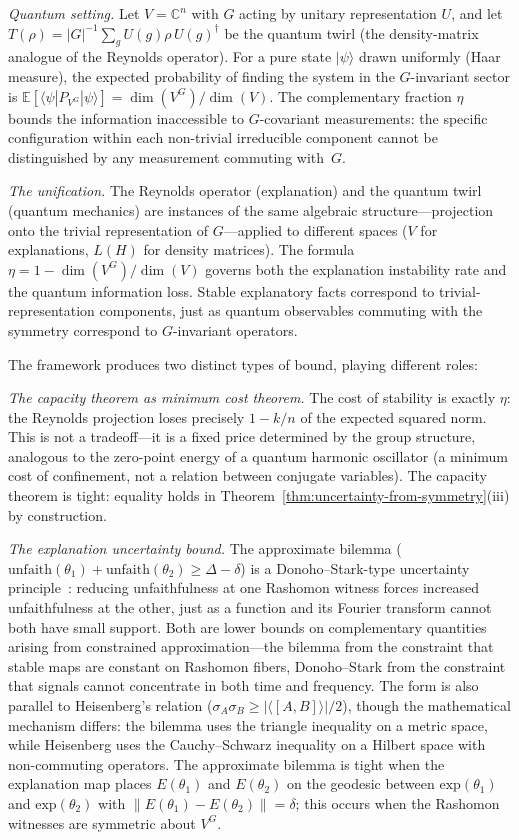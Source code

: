 \documentclass[11pt,a4paper]{article}
\begin{document}
\emph{Quantum setting.}  Let $V = \mathbb{C}^n$ with $G$ acting by unitary representation $U$, and let $T(\rho) = |G|^{-1} \sum_g U(g)\rho\, U(g)^\dagger$ be the quantum twirl (the density-matrix analogue of the Reynolds operator).  For a pure state $|\psi\rangle$ drawn uniformly (Haar measure), the expected probability of finding the system in the $G$-invariant sector is $\mathbb{E}[\langle\psi|P_{V^G}|\psi\rangle] = \dim(V^G)/\dim(V)$.  The complementary fraction $\eta$ bounds the information inaccessible to $G$-covariant measurements: the specific configuration within each non-trivial irreducible component cannot be distinguished by any measurement commuting with~$G$.

\emph{The unification.}  The Reynolds operator (explanation) and the quantum twirl (quantum mechanics) are instances of the same algebraic structure---projection onto the trivial representation of $G$---applied to different spaces ($V$ for explanations, $L(H)$ for density matrices).  The formula $\eta = 1 - \dim(V^G)/\dim(V)$ governs both the explanation instability rate and the quantum information loss.  Stable explanatory facts correspond to trivial-representation components, just as quantum observables commuting with the symmetry correspond to $G$-invariant operators.

The framework produces two distinct types of bound, playing different roles:

\emph{The capacity theorem as minimum cost theorem.}  The cost of stability is exactly $\eta$: the Reynolds projection loses precisely $1 - k/n$ of the expected squared norm.  This is not a tradeoff---it is a fixed price determined by the group structure, analogous to the zero-point energy of a quantum harmonic oscillator (a minimum cost of confinement, not a relation between conjugate variables).  The capacity theorem is tight: equality holds in Theorem~\ref{thm:uncertainty-from-symmetry}(iii) by construction.

\emph{The explanation uncertainty bound.}  The approximate bilemma ($\mathrm{unfaith}(\theta_1) + \mathrm{unfaith}(\theta_2) \geq \Delta - \delta$) is a Donoho--Stark-type uncertainty principle~\citep{donoho1989uncertainty}: reducing unfaithfulness at one Rashomon witness forces increased unfaithfulness at the other, just as a function and its Fourier transform cannot both have small support.  Both are lower bounds on complementary quantities arising from constrained approximation---the bilemma from the constraint that stable maps are constant on Rashomon fibers, Donoho--Stark from the constraint that signals cannot concentrate in both time and frequency.  The form is also parallel to Heisenberg's relation ($\sigma_A \sigma_B \geq |\langle[A,B]\rangle|/2$), though the mathematical mechanism differs: the bilemma uses the triangle inequality on a metric space, while Heisenberg uses the Cauchy--Schwarz inequality on a Hilbert space with non-commuting operators.  The approximate bilemma is tight when the explanation map places $E(\theta_1)$ and $E(\theta_2)$ on the geodesic between $\mathrm{exp}(\theta_1)$ and $\mathrm{exp}(\theta_2)$ with $\|E(\theta_1) - E(\theta_2)\| = \delta$; this occurs when the Rashomon witnesses are symmetric about $V^G$.
\end{document}
